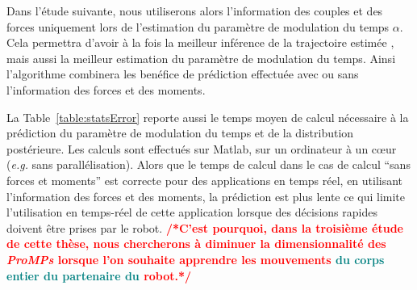 \documentclass[utf8]{frontiersSCNS} %
\newcommand{\toimprove}[1]{\textcolor{teal}{#1}}
\newcommand{\todo}[1]{\textcolor{red}{\textbf{/*#1*/}}}
\begin{document}
Dans l'étude suivante, nous utiliserons alors l'information des couples et des forces uniquement lors de l'estimation du paramètre de modulation du temps $\alpha$. Cela permettra d'avoir à la fois la meilleur inférence de la trajectoire estimée , mais aussi la meilleur estimation du paramètre de modulation du temps. Ainsi l'algorithme combinera les benéfice de prédiction effectuée avec ou sans l'information des forces et des moments.

La Table~\ref{table:statsError} reporte aussi le temps moyen de calcul nécessaire à la prédiction du paramètre de modulation du temps et de la distribution postérieure. Les calculs sont effectués sur Matlab, sur un ordinateur à un cœur  (\textit{e.g.} sans parallélisation). Alors que le temps de calcul dans le cas de calcul ``sans forces et moments'' est correcte pour des applications en temps réel, en utilisant l'information des forces et des moments, la prédiction est plus lente ce qui limite l'utilisation en temps-réel de cette application lorsque des décisions rapides doivent être prises par le robot.
\todo{C'est pourquoi, dans la troisième étude de cette thèse, nous chercherons à diminuer la dimensionnalité des \textit{ProMPs} lorsque l'on souhaite apprendre les mouvements \toimprove{du corps entier du partenaire du} robot.}


\end{document}
